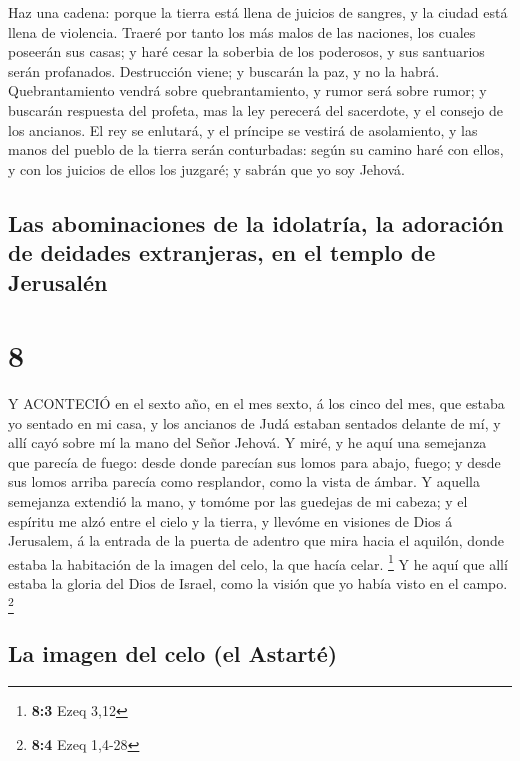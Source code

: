  Haz una cadena: porque la tierra está llena de juicios de
sangres, y la ciudad está llena de violencia.  Traeré por
tanto los más malos de las naciones, los cuales poseerán sus casas; y
haré cesar la soberbia de los poderosos, y sus santuarios serán
profanados.  Destrucción viene; y buscarán la paz, y no la
habrá.  Quebrantamiento vendrá sobre quebrantamiento, y
rumor será sobre rumor; y buscarán respuesta del profeta, mas la ley
perecerá del sacerdote, y el consejo de los ancianos.  El
rey se enlutará, y el príncipe se vestirá de asolamiento, y las manos
del pueblo de la tierra serán conturbadas: según su camino haré con
ellos, y con los juicios de ellos los juzgaré; y sabrán que yo soy
Jehová.

\hypertarget{las-abominaciones-de-la-idolatruxeda-la-adoraciuxf3n-de-deidades-extranjeras-en-el-templo-de-jerusaluxe9n}{%
\subsection{Las abominaciones de la idolatría, la adoración de deidades
extranjeras, en el templo de
Jerusalén}\label{las-abominaciones-de-la-idolatruxeda-la-adoraciuxf3n-de-deidades-extranjeras-en-el-templo-de-jerusaluxe9n}}

\hypertarget{section-7}{%
\section{8}\label{section-7}}

 Y ACONTECIÓ en el sexto año, en el mes sexto, á los cinco
del mes, que estaba yo sentado en mi casa, y los ancianos de Judá
estaban sentados delante de mí, y allí cayó sobre mí la mano del Señor
Jehová.  Y miré, y he aquí una semejanza que parecía de
fuego: desde donde parecían sus lomos para abajo, fuego; y desde sus
lomos arriba parecía como resplandor, como la vista de ámbar.
 Y aquella semejanza extendió la mano, y tomóme por las
guedejas de mi cabeza; y el espíritu me alzó entre el cielo y la tierra,
y llevóme en visiones de Dios á Jerusalem, á la entrada de la puerta de
adentro que mira hacia el aquilón, donde estaba la habitación de la
imagen del celo, la que hacía celar. \footnote{\textbf{8:3} Ezeq 3,12}
 Y he aquí que allí estaba la gloria del Dios de Israel,
como la visión que yo había visto en el campo. \footnote{\textbf{8:4}
  Ezeq 1,4-28}

\hypertarget{la-imagen-del-celo-el-astartuxe9}{%
\subsection{La imagen del celo (el
Astarté)}\label{la-imagen-del-celo-el-astartuxe9}}

